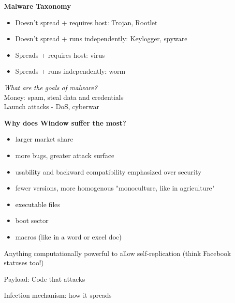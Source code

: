

\textbf{Malware Taxonomy}
\begin{itemize}
	\item Doesn't spread + requires host: Trojan, Rootlet
	\item Doesn't spread + runs independently: Keylogger, spyware
	\item Spreads + requires host: virus
	\item Spreads + runs independently: worm
\end{itemize}

\textit{What are the goals of malware?}\\
Money: spam, steal data and credentials\\
Launch attacks - DoS, cyberwar

\textbf{Why does Window suffer the most?}
\begin{itemize}
	\item larger market share
	\item more bugs, greater attack surface
	\item usability and backward compatibility emphasized over security
	\item fewer versions, more homogenous "monoculture, like in agriculture"
\end{itemize}

\begin{itemize}
	\item executable files
	\item boot sector
	\item macros (like in a word or excel doc)
\end{itemize}

Anything computationally powerful to allow self-replication
(think Facebook statuses too!) 

\begin{definition}
Payload: Code that attacks
\end{definition}

\begin{definition}
Infection mechanism: how it spreads
\end{definition}

